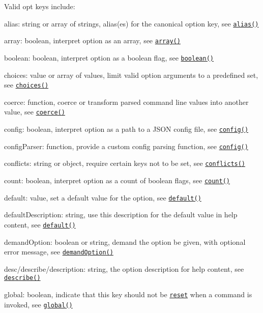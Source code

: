 Valid {\ttfamily opt} keys include\+:


\begin{DoxyItemize}
\item {\ttfamily alias}\+: string or array of strings, alias(es) for the canonical option key, see \href{#alias}{\tt {\ttfamily alias()}}
\item {\ttfamily array}\+: boolean, interpret option as an array, see \href{#array}{\tt {\ttfamily array()}}
\item {\ttfamily boolean}\+: boolean, interpret option as a boolean flag, see \href{#boolean}{\tt {\ttfamily boolean()}}
\item {\ttfamily choices}\+: value or array of values, limit valid option arguments to a predefined set, see \href{#choices}{\tt {\ttfamily choices()}}
\item {\ttfamily coerce}\+: function, coerce or transform parsed command line values into another value, see \href{#coerce}{\tt {\ttfamily coerce()}}
\item {\ttfamily config}\+: boolean, interpret option as a path to a J\+S\+ON config file, see \href{#config}{\tt {\ttfamily config()}}
\item {\ttfamily config\+Parser}\+: function, provide a custom config parsing function, see \href{#config}{\tt {\ttfamily config()}}
\item {\ttfamily conflicts}\+: string or object, require certain keys not to be set, see \href{#conflicts}{\tt {\ttfamily conflicts()}}
\item {\ttfamily count}\+: boolean, interpret option as a count of boolean flags, see \href{#count}{\tt {\ttfamily count()}}
\item {\ttfamily default}\+: value, set a default value for the option, see \href{#default}{\tt {\ttfamily default()}}
\item {\ttfamily default\+Description}\+: string, use this description for the default value in help content, see \href{#default}{\tt {\ttfamily default()}}
\item {\ttfamily demand\+Option}\+: boolean or string, demand the option be given, with optional error message, see \href{#demandOption}{\tt {\ttfamily demand\+Option()}}
\item {\ttfamily desc}/{\ttfamily describe}/{\ttfamily description}\+: string, the option description for help content, see \href{#describe}{\tt {\ttfamily describe()}}
\item {\ttfamily global}\+: boolean, indicate that this key should not be \href{#reset}{\tt reset} when a command is invoked, see \href{#global}{\tt {\ttfamily global()}}

\end{DoxyItemize}
